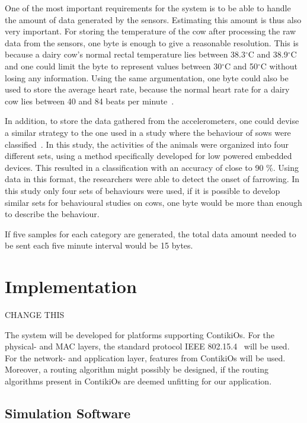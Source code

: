 \documentclass[conference]{IEEEtran}
\begin{document}
One of the most important requirements for the system is to be able to handle
the amount of data generated by the sensors. Estimating this amount is thus
also very important. For storing the temperature of the cow after processing
the raw data from the sensors, one byte is enough to give a reasonable
resolution. This is because a dairy cow’s normal rectal temperature lies
between 38.3$^\circ$C and 38.9$^\circ$C~\cite{wikibov} and one could limit the
byte to represent values between 30$^\circ$C and 50$^\circ$C without losing any
information.  Using the same argumentation, one byte could also be used to
store the average heart rate, because the normal heart rate for a dairy cow
lies between 40 and 84 beats per minute~\cite{wikibov}.

In addition, to store the data gathered from the accelerometers, one could
devise a similar strategy to the one used in a study where the behaviour of
sows were classified~\cite{marchiorosows2011}. In this study, the activities
of the animals were organized into four different sets, using a method
specifically developed for low powered embedded devices. This resulted in
a classification with an accuracy of close to 90 \%. Using data in this format,
the researchers were able to detect the onset of farrowing. In this study only
four sets of behaviours were used, if it is possible to develop similar sets
for behavioural studies on cows, one byte would be more than enough to
describe the behaviour.

If five samples for each category are generated, the total data amount needed to
be sent each five minute interval would be 15 bytes.


\section{Implementation}

CHANGE THIS

The system will be developed for platforms supporting ContikiOs. For the
physical- and MAC layers, the standard protocol IEEE 802.15.4~\cite{ieee802154}
will be used.  For the network- and application layer, features from ContikiOs
will be used.  Moreover, a routing algorithm might possibly be designed, if the
routing algorithms present in ContikiOs are deemed unfitting for our
application. 

\subsection{Simulation Software}
\end{document}
